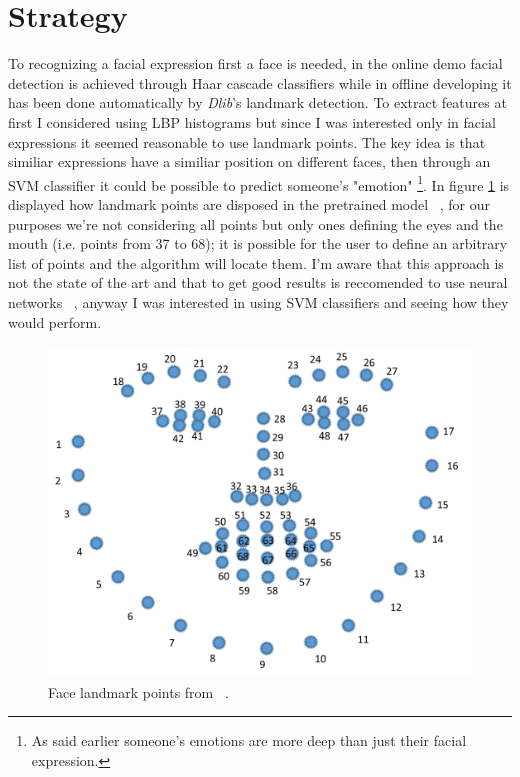 \section{Strategy}
To recognizing a facial expression first a face is needed, in the online demo facial detection is achieved through Haar cascade classifiers while in offline developing it has been done automatically by \textit{Dlib}'s landmark detection.
To extract features at first I considered using LBP histograms but since I was interested only in facial expressions it seemed reasonable to use landmark points. 
The key idea is that similiar expressions have a similiar position on different faces, then through an SVM classifier it could be possible to predict someone's "emotion" \footnote{As said earlier someone's emotions are more deep than just their facial expression.}.
In figure \ref{fig:landmarks} is displayed how landmark points are disposed in the pretrained model ~\cite{dataset:landmark}, for our purposes we're not considering all points but only ones defining the eyes and the mouth (i.e. points from 37 to 68); it is possible for the user to define an arbitrary list of points and the algorithm will locate them.
I'm aware that this approach is not the state of the art and that to get good results is reccomended to use neural networks ~\cite{blog:emotion}, anyway I was interested in using SVM classifiers and seeing how they would perform.

\begin{figure}[h!t]
    \centering
    \includegraphics[scale=0.2]{images/landmark.png}
    \caption{Face landmark points from ~\cite{landmark:guide}.}
    \label{fig:landmarks}
\end{figure}

